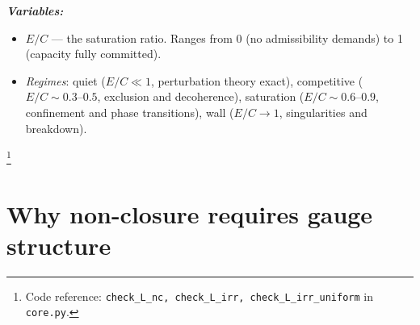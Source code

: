 \documentclass[11pt]{article}
\newenvironment{varlist}{\begin{itemize}[nosep,leftmargin=2em]}{\end{itemize}}
\newcommand{\coderef}[2]{\footnote{Code reference: \texttt{#1} in \texttt{#2}.}}
\begin{document}
\begin{tcolorbox}[apfbox, title={Consequences of $L_{\mathrm{nc}}^{\mathrm{interf}}$: Superadditivity, Path Dependence, Saturation}]
\smallskip\noindent\textbf{\textit{Variables:}}
\begin{varlist}
\item $E/C$ --- the saturation ratio.  Ranges from 0 (no admissibility demands) to 1 (capacity fully committed).
\item \textit{Regimes}: quiet ($E/C \ll 1$, perturbation theory exact), competitive ($E/C \sim 0.3$--$0.5$, exclusion and decoherence), saturation ($E/C \sim 0.6$--$0.9$, confinement and phase transitions), wall ($E/C \to 1$, singularities and breakdown).
\end{varlist}
\coderef{check\_L\_nc, check\_L\_irr, check\_L\_irr\_uniform}{core.py}
\end{tcolorbox}


\section{Why non-closure requires gauge structure}
\label{sec:gauge_origin}
\end{document}
